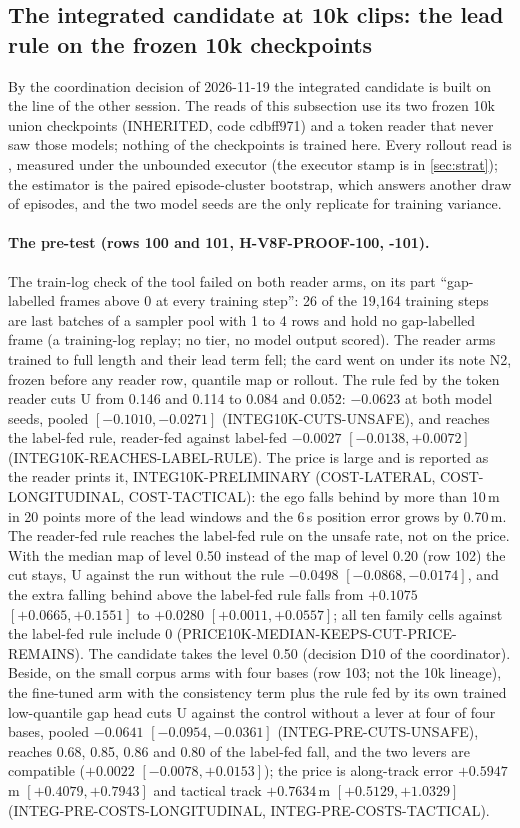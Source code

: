 \subsection{The integrated candidate at 10k clips: the lead rule on the frozen 10k checkpoints}\label{sec:integ10k}
By the coordination decision of 2026-11-19 the integrated candidate is built on the line of the other session. The reads of this subsection use its two frozen 10k union checkpoints (INHERITED, code cdbff971) and a token reader that never saw those models; nothing of the checkpoints is trained here. Every rollout read is , measured under the unbounded executor (the executor stamp is in \cref{sec:strat}); the estimator is the paired episode-cluster bootstrap, which answers another draw of episodes, and the two model seeds are the only replicate for training variance.

\paragraph{The pre-test (rows 100 and 101, H-V8F-PROOF-100, -101).} The train-log check of the tool failed on both reader arms, on its part ``gap-labelled frames above 0 at every training step'': 26 of the 19,164 training steps are last batches of a sampler pool with 1 to 4 rows and hold no gap-labelled frame (a training-log replay; no tier, no model output scored). The reader arms trained to full length and their lead term fell; the card went on under its note N2, frozen before any reader row, quantile map or rollout. The rule fed by the token reader cuts U from 0.146 and 0.114 to 0.084 and 0.052: $-0.0623$ at both model seeds, pooled $[-0.1010,-0.0271]$ (INTEG10K-CUTS-UNSAFE), and reaches the label-fed rule, reader-fed against label-fed $-0.0027$ $[-0.0138,+0.0072]$ (INTEG10K-REACHES-LABEL-RULE). The price is large and is reported as the reader prints it, INTEG10K-PRELIMINARY (COST-LATERAL, COST-LONGITUDINAL, COST-TACTICAL): the ego falls behind by more than 10\,m in 20 points more of the lead windows and the 6\,s position error grows by 0.70\,m. The reader-fed rule reaches the label-fed rule on the unsafe rate, not on the price. With the median map of level 0.50 instead of the map of level 0.20 (row 102) the cut stays, U against the run without the rule $-0.0498$ $[-0.0868,-0.0174]$, and the extra falling behind above the label-fed rule falls from $+0.1075$ $[+0.0665,+0.1551]$ to $+0.0280$ $[+0.0011,+0.0557]$; all ten family cells against the label-fed rule include 0 (PRICE10K-MEDIAN-KEEPS-CUT-PRICE-REMAINS). The candidate takes the level 0.50 (decision D10 of the coordinator). Beside, on the small corpus arms with four bases (row 103; not the 10k lineage), the fine-tuned arm with the consistency term plus the rule fed by its own trained low-quantile gap head cuts U against the control without a lever at four of four bases, pooled $-0.0641$ $[-0.0954,-0.0361]$ (INTEG-PRE-CUTS-UNSAFE), reaches 0.68, 0.85, 0.86 and 0.80 of the label-fed fall, and the two levers are compatible ($+0.0022$ $[-0.0078,+0.0153]$); the price is along-track error $+0.5947$\,m $[+0.4079,+0.7943]$ and tactical track $+0.7634$\,m $[+0.5129,+1.0329]$ (INTEG-PRE-COSTS-LONGITUDINAL, INTEG-PRE-COSTS-TACTICAL).

